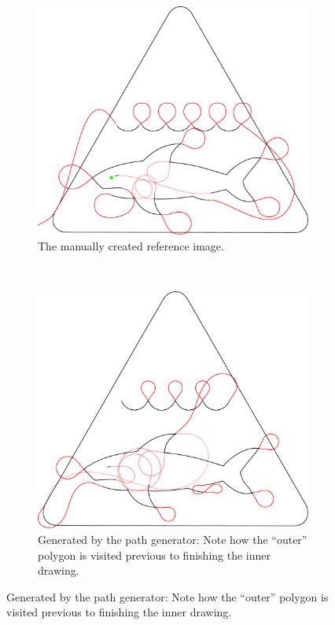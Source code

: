 \begin{figure}[h]
\centering
\begin{subfigure}[t]{0.45\textwidth}
	\includegraphics[width=\textwidth]{images/results/shark/hai_achtung.pdf}
	\caption{The manually created reference image.}
\end{subfigure}~
\begin{subfigure}[t]{0.45\textwidth}
	\includegraphics[width=\textwidth]{images/results/shark/export_hai_new.pdf}
	\caption{Generated by the path generator: Note how the \enquote{outer} polygon is visited previous to finishing the inner drawing.}

\end{subfigure}
\end{figure}
